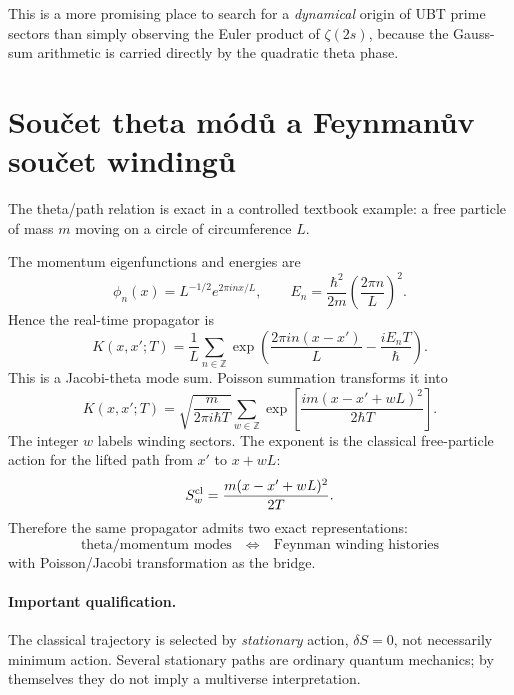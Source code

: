 This is a more promising place to search for a \emph{dynamical} origin of UBT prime
sectors than simply observing the Euler product of $\zeta(2s)$, because the Gauss-sum
arithmetic is carried directly by the quadratic theta phase.

\section{Součet theta módů a Feynmanův součet windingů}
\label{sec:theta-feynman}

The theta/path relation is exact in a controlled textbook example: a free particle of
mass $m$ moving on a circle of circumference $L$.

The momentum eigenfunctions and energies are
\begin{equation}
 \phi_n(x)=L^{-1/2}e^{2\pi i n x/L},
 \qquad
 E_n=\frac{\hbar^2}{2m}\left(\frac{2\pi n}{L}\right)^2.
\end{equation}
Hence the real-time propagator is
\begin{equation}
 K(x,x';T)
 =\frac1L\sum_{n\in\mathbb Z}
 \exp\!\left(\frac{2\pi i n(x-x')}{L}
             -\frac{iE_nT}{\hbar}\right).
 \label{eq:circle-mode-propagator}
\end{equation}
This is a Jacobi-theta mode sum.  Poisson summation transforms it into
\begin{equation}
 \boxed{
 K(x,x';T)
 =\sqrt{\frac{m}{2\pi i\hbar T}}
  \sum_{w\in\mathbb Z}
  \exp\!\left[
   \frac{i m(x-x'+wL)^2}{2\hbar T}
  \right].}
 \label{eq:circle-winding-propagator}
\end{equation}
The integer $w$ labels winding sectors.  The exponent is the classical free-particle
action for the lifted path from $x'$ to $x+wL$:
\begin{equation}
 S_w^{\rm cl}=\frac{m(x-x'+wL)^2}{2T}.
\end{equation}
Therefore the same propagator admits two exact representations:
\begin{equation}
 \boxed{
 \text{theta/momentum modes}
 \quad\Longleftrightarrow\quad
 \text{Feynman winding histories}}
 \label{eq:mode-winding-duality}
\end{equation}
with Poisson/Jacobi transformation as the bridge.

\paragraph{Important qualification.}
The classical trajectory is selected by \emph{stationary} action,
$\delta S=0$, not necessarily minimum action.  Several stationary paths are ordinary
quantum mechanics; by themselves they do not imply a multiverse interpretation.

